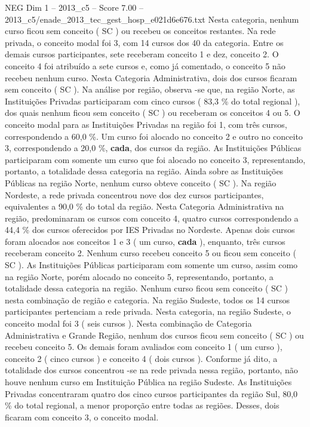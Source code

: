 \begin{textsample}{NEG Dim 1 – 2013\_c5 – Score 7.00 – 2013\_c5/enade\_2013\_tec\_gest\_hosp\_e021d6e676.txt}
Nesta categoria, nenhum curso ficou sem conceito ( SC ) ou recebeu os conceitos restantes.
Na rede privada, o conceito modal foi 3, com 14 cursos dos 40 da categoria.
Entre os demais cursos participantes, sete receberam conceito 1 e dez, conceito 2.
O conceito 4 foi atribuído a sete cursos e, como já comentado, o conceito 5 não recebeu nenhum curso.
Nesta Categoria Administrativa, dois dos cursos ficaram sem conceito ( SC ).
Na análise por região, observa -se que, na região Norte, as Instituições Privadas participaram com cinco cursos ( 83,3 \% do total regional ), dos quais nenhum ficou sem conceito ( SC ) ou receberam os conceitos 4 ou 5.
O conceito modal para as Instituições Privadas na região foi 1, com três cursos, correspondendo a 60,0 \%.
Um curso foi alocado no conceito 2 e outro no conceito 3, correspondendo a 20,0 \%, \textbf{cada}, dos cursos da região.
As Instituições Públicas participaram com somente um curso que foi alocado no conceito 3, representando, portanto, a totalidade dessa categoria na região.
Ainda sobre as Instituições Públicas na região Norte, nenhum curso obteve conceito ( SC ).
Na região Nordeste, a rede privada concentrou nove dos dez cursos participantes, equivalentes a 90,0 \% do total da região.
Nesta Categoria Administrativa na região, predominaram os cursos com conceito 4, quatro cursos correspondendo a 44,4 \% dos cursos oferecidos por IES Privadas no Nordeste.
Apenas dois cursos foram alocados aos conceitos 1 e 3 ( um curso, \textbf{cada} ), enquanto, três cursos receberam conceito 2.
Nenhum curso recebeu conceito 5 ou ficou sem conceito ( SC ).
As Instituições Públicas participaram com somente um curso, assim como na região Norte, porém alocado no conceito 5, representando, portanto, a totalidade dessa categoria na região.
Nenhum curso ficou sem conceito ( SC ) nesta combinação de região e categoria.
Na região Sudeste, todos os 14 cursos participantes pertenciam a rede privada.
Nesta categoria, na região Sudeste, o conceito modal foi 3 ( seis cursos ).
Nesta combinação de Categoria Administrativa e Grande Região, nenhum dos cursos ficou sem conceito ( SC ) ou recebeu conceito 5.
Os demais foram avaliados com conceito 1 ( um curso ), conceito 2 ( cinco cursos ) e conceito 4 ( dois cursos ).
Conforme já dito, a totalidade dos cursos concentrou -se na rede privada nessa região, portanto, não houve nenhum curso em Instituição Pública na região Sudeste.
As Instituições Privadas concentraram quatro dos cinco cursos participantes da região Sul, 80,0 \% do total regional, a menor proporção entre todas as regiões.
Desses, dois ficaram com conceito 3, o conceito modal.

\end{textsample}
